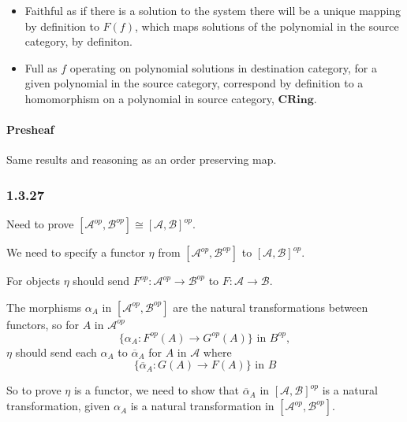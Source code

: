 \documentclass{article}
\begin{document}
\begin{itemize}
\item
Faithful as if there is a solution to the system there will be a unique mapping by definition to $F(f)$, which maps solutions of the polynomial in the source category, by definiton.

\item Full as $f$ operating on polynomial solutions in destination category, for a given polynomial in the source category, correspond by definition to a homomorphism on a polynomial in source category, $\mathbf{CRing}$.
\end{itemize}

\paragraph{Presheaf}

Same results and reasoning as an order preserving map.

\subsubsection*{ 1.3.27 }

Need to prove $[\mathcal{A}^{op},\mathcal{B}^{op}] \cong [\mathcal{A}, \mathcal{B}]^{op}$.

We need to specify a functor $\eta$ from $[\mathcal{A}^{op},\mathcal{B}^{op}]$ to
$[\mathcal{A}, \mathcal{B}]^{op}$.

For objects $\eta$ should send ${F}^{op}\colon\mathcal{A}^{op} \rightarrow \mathcal{B}^{op}$ to $F\colon\mathcal{A} \rightarrow \mathcal{B}$.

The morphisms $\alpha_A$ in $[\mathcal{A}^{op},\mathcal{B}^{op}]$ are the natural transformations between functors, so for $A \text{ in } \mathcal{A}^{op}$
\begin{equation*}
  \{ \alpha_{A}\colon F^{op}(A) \rightarrow G^{op}(A) \} \text{ in } B^{op},
\end{equation*}
$\eta$ should send each $\alpha_A$ to $\overline{\alpha}_A$ for $A$ in $\mathcal{A}$ where
\begin{equation*}
  \{ \overline{\alpha}_A\colon G(A) \rightarrow F(A) \} \text{ in } B
\end{equation*}

So to prove $\eta$ is a functor, we need to show that $\overline{\alpha}_A$ in $[\mathcal{A}, \mathcal{B}]^{op}$ is a natural transformation, given $\alpha_{A}$ is a natural transformation in $[\mathcal{A}^{op},\mathcal{B}^{op}]$.
\end{document}
